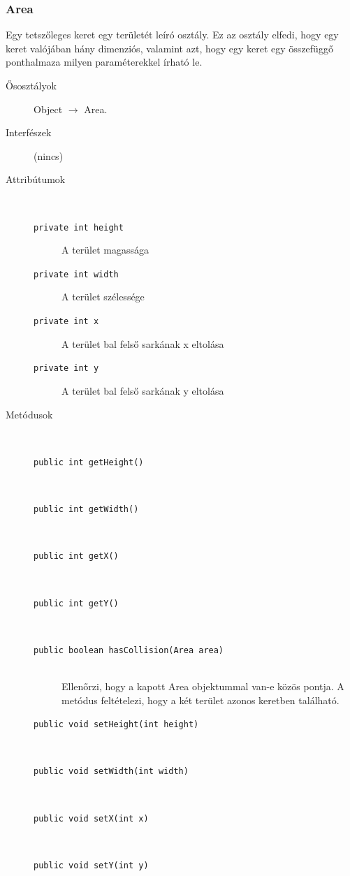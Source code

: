 		\subsubsection{Area}
				 Egy tetszőleges keret egy területét leíró osztály.  Ez az osztály elfedi, hogy egy keret valójában hány dimenziós,  valamint azt, hogy egy keret egy összefüggő ponthalmaza milyen   paraméterekkel írható le. 			\begin{description}


				\item[Ősosztályok] Object $\rightarrow{}$ Area.
				\item[Interfészek] (nincs)
				\item[Attribútumok]$\ $
					\begin{description}
						\item[\texttt{private int height}] A terület magassága 
						\item[\texttt{private int width}] A terület szélessége 
						\item[\texttt{private int x}] A terület bal felső sarkának x eltolása 
						\item[\texttt{private int y}] A terület bal felső sarkának y eltolása 
					\end{description}
				\item[Metódusok]$\ $
					\begin{description}
						\item[\texttt{public int getHeight()}] \hfill \\
						\item[\texttt{public int getWidth()}] \hfill \\
						\item[\texttt{public int getX()}] \hfill \\
						\item[\texttt{public int getY()}] \hfill \\
						\item[\texttt{public boolean hasCollision(Area area)}] \hfill \\ Ellenőrzi, hogy a kapott Area objektummal van-e közös pontja.  A metódus feltételezi, hogy a két terület azonos keretben található. 
						\item[\texttt{public void setHeight(int height)}] \hfill \\
						\item[\texttt{public void setWidth(int width)}] \hfill \\
						\item[\texttt{public void setX(int x)}] \hfill \\
						\item[\texttt{public void setY(int y)}] \hfill \\
					\end{description}
			\end{description}


